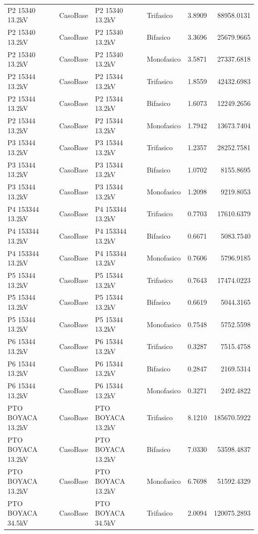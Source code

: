 \documentclass[11pt,a4paper]{article}
\begin{document}
\begin{longtable}{llllrr}
P2 15340 13.2kV & CasoBase & P2 15340 13.2kV & Trifasico & 3.8909 & 88958.0131 \\
P2 15340 13.2kV & CasoBase & P2 15340 13.2kV & Bifasico & 3.3696 & 25679.9665 \\
P2 15340 13.2kV & CasoBase & P2 15340 13.2kV & Monofasico & 3.5871 & 27337.6818 \\
P2 15344 13.2kV & CasoBase & P2 15344 13.2kV & Trifasico & 1.8559 & 42432.6983 \\
P2 15344 13.2kV & CasoBase & P2 15344 13.2kV & Bifasico & 1.6073 & 12249.2656 \\
P2 15344 13.2kV & CasoBase & P2 15344 13.2kV & Monofasico & 1.7942 & 13673.7404 \\
P3 15344 13.2kV & CasoBase & P3 15344 13.2kV & Trifasico & 1.2357 & 28252.7581 \\
P3 15344 13.2kV & CasoBase & P3 15344 13.2kV & Bifasico & 1.0702 & 8155.8695 \\
P3 15344 13.2kV & CasoBase & P3 15344 13.2kV & Monofasico & 1.2098 & 9219.8053 \\
P4 153344 13.2kV & CasoBase & P4 153344 13.2kV & Trifasico & 0.7703 & 17610.6379 \\
P4 153344 13.2kV & CasoBase & P4 153344 13.2kV & Bifasico & 0.6671 & 5083.7540 \\
P4 153344 13.2kV & CasoBase & P4 153344 13.2kV & Monofasico & 0.7606 & 5796.9185 \\
P5 15344 13.2kV & CasoBase & P5 15344 13.2kV & Trifasico & 0.7643 & 17474.0223 \\
P5 15344 13.2kV & CasoBase & P5 15344 13.2kV & Bifasico & 0.6619 & 5044.3165 \\
P5 15344 13.2kV & CasoBase & P5 15344 13.2kV & Monofasico & 0.7548 & 5752.5598 \\
P6 15344 13.2kV & CasoBase & P6 15344 13.2kV & Trifasico & 0.3287 & 7515.4758 \\
P6 15344 13.2kV & CasoBase & P6 15344 13.2kV & Bifasico & 0.2847 & 2169.5314 \\
P6 15344 13.2kV & CasoBase & P6 15344 13.2kV & Monofasico & 0.3271 & 2492.4822 \\
PTO BOYACA 13.2kV & CasoBase & PTO BOYACA 13.2kV & Trifasico & 8.1210 & 185670.5922 \\
PTO BOYACA 13.2kV & CasoBase & PTO BOYACA 13.2kV & Bifasico & 7.0330 & 53598.4837 \\
PTO BOYACA 13.2kV & CasoBase & PTO BOYACA 13.2kV & Monofasico & 6.7698 & 51592.4329 \\
PTO BOYACA 34.5kV & CasoBase & PTO BOYACA 34.5kV & Trifasico & 2.0094 & 120075.2893 \\

\end{longtable}
\end{document}
